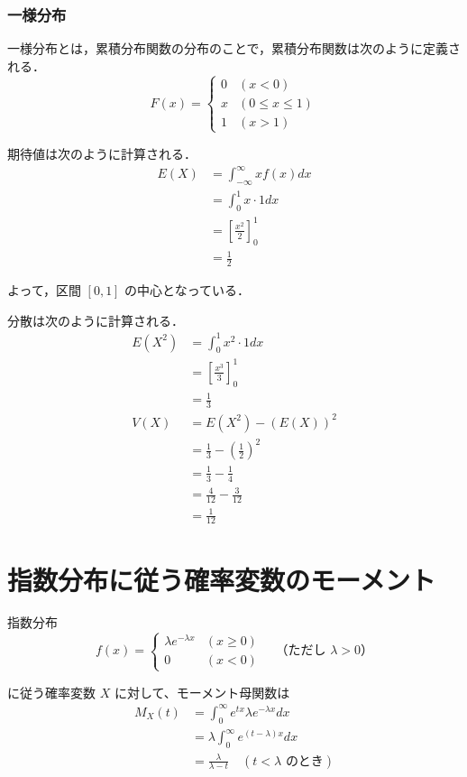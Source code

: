 \documentclass[titlepage,a4paper]{jsarticle}
\begin{document}
\subsubsection{一様分布}\label{itiyo}
一様分布とは，累積分布関数の分布のことで，累積分布関数は次のように定義される．
\[
  F(x) =
  \begin{cases}
    0 & (x < 0)           \\
    x & (0 \leq x \leq 1) \\
    1 & (x > 1)
  \end{cases}
\]

期待値は次のように計算される．
\begin{align*}
  E(X) & = \int_{-\infty}^\infty x f(x) dx  \\
       & = \int_0^1 x \cdot 1 dx            \\
       & = \left[ \frac{x^2}{2} \right]_0^1 \\
       & = \frac{1}{2}
\end{align*}

よって，区間 \([0, 1]\) の中心となっている．

分散は次のように計算される．
\begin{align*}
  E(X^2) & = \int_0^1 x^2 \cdot 1 dx                    \\
         & = \left[ \frac{x^3}{3} \right]_0^1           \\
         & = \frac{1}{3}                                \\
  V(X)   & = E(X^2) - (E(X))^2                          \\
         & = \frac{1}{3} - \left( \frac{1}{2} \right)^2 \\
         & = \frac{1}{3} - \frac{1}{4}                  \\
         & = \frac{4}{12} - \frac{3}{12}                \\
         & = \frac{1}{12}
\end{align*}
\section{指数分布に従う確率変数のモーメント}%
指数分布
\[
  f(x) =
  \begin{cases}
    \lambda e^{-\lambda x} & (x \geq 0) \\
    0                      & (x < 0)
  \end{cases}
  \quad \text{（ただし } \lambda > 0 \text{）}
\]

に従う確率変数 $X$ に対して、モーメント母関数は
\begin{align}
  M_X(t) & = \int_0^{\infty} e^{tx} \lambda e^{-\lambda x} dx                       \\
         & = \lambda \int_0^{\infty} e^{(t-\lambda)x} dx                            \\
         & = \frac{\lambda}{\lambda - t} \quad (t < \lambda \text{ のとき})\label{3_0}
\end{align}
\end{document}
